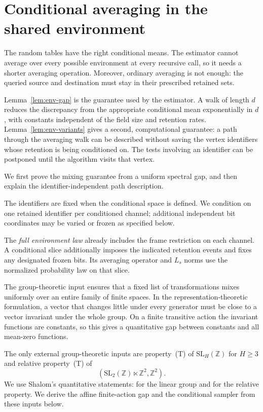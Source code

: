 \section{Conditional averaging in the shared environment}
\label{sec:averaging}

The random tables have the right conditional means. The estimator cannot average over every possible environment at every recursive call, so it needs a shorter averaging operation. Moreover, ordinary averaging is not enough: the queried source and destination must stay in their prescribed retained sets.

Lemma~\ref{lem:env-gap} is the guarantee used by the estimator. A walk of length $d$ reduces the discrepancy from the appropriate conditional mean exponentially in $d$, with constants independent of the field size and retention rates. Lemma~\ref{lem:env-variants} gives a second, computational guarantee: a path through the averaging walk can be described without saving the vertex identifiers whose retention is being conditioned on. The tests involving an identifier can be postponed until the algorithm visits that vertex.

We first prove the mixing guarantee from a uniform spectral gap, and then explain the identifier-independent path description.

The identifiers are fixed when the conditional space is defined.  We
condition on one retained identifier per conditioned channel; additional
independent bit coordinates may be varied or frozen as specified below.

The \emph{full environment law} already includes the frame restriction
on each channel.  A conditional slice additionally imposes the indicated
retention events and fixes any designated frozen bits.  Its averaging
operator and $L_s$ norms use the normalized probability law on that slice.

The group-theoretic input ensures that a fixed list of transformations mixes uniformly over an entire family of finite spaces. In the representation-theoretic formulation, a vector that changes little under every generator must be close to a vector invariant under the whole group. On a finite transitive action the invariant functions are constants, so this gives a quantitative gap between constants and all mean-zero functions.

The only external group-theoretic inputs are property~(T) of
$\mathrm{SL}_H(\mathbb Z)$ for $H\ge3$ and relative property~(T) of
\[
(\mathrm{SL}_2(\mathbb Z)\ltimes\mathbb Z^2,\mathbb Z^2).
\]
We use Shalom's quantitative statements:
\cite[Theorem~2.6, p.~156]{Shalom1999} for the linear group and
\cite[Theorem~2.1, p.~152]{Shalom1999} for the relative property.
We derive the affine finite-action gap and the conditional sampler from
these inputs below.

